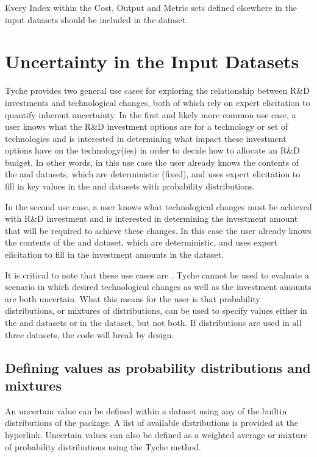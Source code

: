 \documentclass[letterpaper,10pt,english]{sphinxmanual}
\begin{document}
\sphinxAtStartPar
{} Every Index within the Cost, Output and Metric sets defined elsewhere in the input datasets should be included in the  dataset.


\section{Uncertainty in the Input Datasets}
\label{\detokenize{cheat-sheet:uncertainty-in-the-input-datasets}}
\sphinxAtStartPar
Tyche provides two general use cases for exploring the relationship between R\&D investments and technological changes, both of which rely on expert elicitation to quantify inherent uncertainty. In the first and likely more common use case, a user knows what the R\&D investment options are for a technology or set of technologies and is interested in determining what impact these investment options have on the technology(ies) in order to decide how to allocate an R\&D budget. In other words, in this use case the user already knows the contents of the  and  datasets, which are deterministic (fixed), and uses expert elicitation to fill in key values in the  and  datasets with probability distributions.

\sphinxAtStartPar
In the second use case, a user knows what technological changes must be achieved with R\&D investment and is interested in determining the investment amount that will be required to achieve these changes. In this case the user already knows the contents of the  and  dataset, which are deterministic, and uses expert elicitation to fill in the investment amounts in the  dataset.

\sphinxAtStartPar
It is critical to note that these use cases are . Tyche cannot be used to evaluate a scenario in which desired technological changes as well as the investment amounts are both uncertain. What this means for the user is that probability distributions, or mixtures of distributions, can be used to specify values either in the  and  datasets or in the  dataset, but not both. If distributions are used in all three datasets, the code will break by design.


\subsection{Defining values as probability distributions and mixtures}
\label{\detokenize{cheat-sheet:defining-values-as-probability-distributions-and-mixtures}}
\sphinxAtStartPar
An uncertain value can be defined within a dataset using any of the built\sphinxhyphen{}in distributions of the  package. A list of available distributions is provided at the hyperlink. Uncertain values can also be defined as a weighted average or mixture of probability distributions using the Tyche  method.
\end{document}
